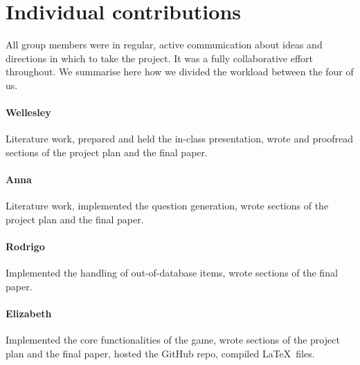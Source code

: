 \documentclass[11pt,a4paper]{article}
\begin{document}
\appendix

\section{Individual contributions}
\label{app:contributions}

All group members were in regular, active communication about ideas and directions in which to take the project.
It was a fully collaborative effort throughout.
We summarise here how we divided the workload between the four of us.

\paragraph{Wellesley} Literature work, prepared and held the in-class presentation, wrote and proofread sections of the project plan and the final paper.

\paragraph{Anna} Literature work, implemented the question generation, wrote sections of the project plan and the final paper.

\paragraph{Rodrigo} Implemented the handling of out-of-database items, wrote sections of the final paper.

\paragraph{Elizabeth} Implemented the core functionalities of the game, wrote sections of the project plan and the final paper, hosted the GitHub repo, compiled \LaTeX\ files.
\end{document}
